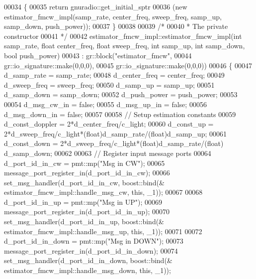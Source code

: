 \begin{DoxyCode}
00034     \{
00035       \textcolor{keywordflow}{return} gnuradio::get\_initial\_sptr
00036         (\textcolor{keyword}{new} estimator_fmcw_impl(samp\_rate, center\_freq, sweep\_freq, samp\_up, samp\_down, push\_power));
00037     \}
00038 
00039     \textcolor{comment}{/*}
00040 \textcolor{comment}{     * The private constructor}
00041 \textcolor{comment}{     */}
00042     estimator_fmcw_impl::estimator_fmcw_impl(\textcolor{keywordtype}{int} samp_rate, \textcolor{keywordtype}{float} center_freq, \textcolor{keywordtype}{float} 
      sweep_freq, \textcolor{keywordtype}{int} samp_up, \textcolor{keywordtype}{int} samp_down, \textcolor{keywordtype}{bool} push\_power)
00043       : gr::block(\textcolor{stringliteral}{"estimator\_fmcw"},
00044               gr::io\_signature::make(0,0,0),
00045               gr::io\_signature::make(0,0,0))
00046     \{
00047         d_samp_rate = samp_rate;
00048         d_center_freq = center_freq;
00049         d_sweep_freq = sweep_freq;
00050         d_samp_up = samp_up;
00051         d_samp_down = samp_down;
00052         d_push_power = push\_power;
00053         
00054         d_msg_cw_in = \textcolor{keyword}{false};
00055         d_msg_up_in = \textcolor{keyword}{false};
00056         d_msg_down_in = \textcolor{keyword}{false};
00057         
00058         \textcolor{comment}{// Setup estimation constants}
00059         d_const_doppler = 2*d_center_freq/c_light;
00060         d_const_up = 2*d_sweep_freq/c_light*(float)d_samp_rate/(\textcolor{keywordtype}{float})d_samp_up;
00061         d_const_down = 2*d_sweep_freq/c_light*(float)d_samp_rate/(\textcolor{keywordtype}{float})
      d_samp_down;
00062         
00063         \textcolor{comment}{// Register input message ports}
00064         d_port_id_in_cw = pmt::mp(\textcolor{stringliteral}{"Msg in CW"});
00065         message\_port\_register\_in(d_port_id_in_cw);
00066         set\_msg\_handler(d_port_id_in_cw, boost::bind(&
      estimator_fmcw_impl::handle_msg_cw, \textcolor{keyword}{this}, \_1));
00067         
00068         d_port_id_in_up = pmt::mp(\textcolor{stringliteral}{"Msg in UP"});
00069         message\_port\_register\_in(d_port_id_in_up);
00070         set\_msg\_handler(d_port_id_in_up, boost::bind(&
      estimator_fmcw_impl::handle_msg_up, \textcolor{keyword}{this}, \_1));
00071         
00072         d_port_id_in_down = pmt::mp(\textcolor{stringliteral}{"Msg in DOWN"});
00073         message\_port\_register\_in(d_port_id_in_down);
00074         set\_msg\_handler(d_port_id_in_down, boost::bind(&
      estimator_fmcw_impl::handle_msg_down, \textcolor{keyword}{this}, \_1));

\end{DoxyCode}
